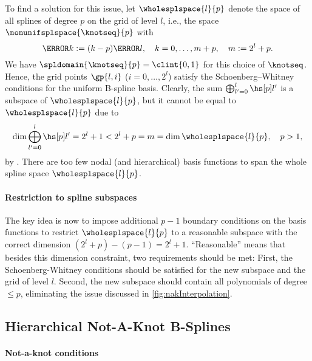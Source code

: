 To find a solution for this issue,
let $\wholesplspace{l}{p}$ denote the space of all splines of degree $p$
on the grid of level $l$, i.e., the space $\nonunifsplspace{\knotseq}{p}$ with
\begin{equation}
  \label{eq:fullGridKnots}
  \knot{k} := (k - p) \ms{l},\quad
  k = 0, \dotsc, m + p,\quad
  m := 2^l + p.
\end{equation}
We have $\spldomain{\knotseq}{p} = \clint{0, 1}$
for this choice of $\knotseq$.
Hence, the grid points $\gp{l,i}$ ($i = 0, \dotsc, 2^l$) satisfy
the Schoenberg--Whitney conditions for the uniform B-spline basis.
Clearly, the sum $\bigoplus_{l'=0}^l \hsbspl{l'}{p}$
is a subspace of $\wholesplspace{l}{p}$,
but it cannot be equal to $\wholesplspace{l}{p}$ due to
\begin{equation}
  \dim \bigoplus_{l'=0}^l \hsbspl{l'}{p}
  = 2^l + 1
  < 2^l + p
  = m
  = \dim \wholesplspace{l}{p},\quad
  p > 1,
\end{equation}
by .
There are too few nodal (and hierarchical) basis functions to
span the whole spline space $\wholesplspace{l}{p}$.

\paragraph{Restriction to spline subspaces}

The key idea is now to impose additional $p - 1$ boundary conditions
on the basis functions to restrict $\wholesplspace{l}{p}$ to a reasonable subspace
with the correct dimension $(2^l + p) - (p - 1) = 2^l + 1$.
``Reasonable'' means that besides this dimension constraint,
two requirements should be met:
First, the Schoenberg-Whitney conditions should be satisfied for
the new subspace and the grid of level $l$.
Second, the new subspace should contain all polynomials of degree $\le p$,
eliminating the issue discussed in \cref{fig:nakInterpolation}.



\subsection{Hierarchical Not-A-Knot B-Splines}
\label{sec:322NAKBSplines}

\paragraph{Not-a-knot conditions}


